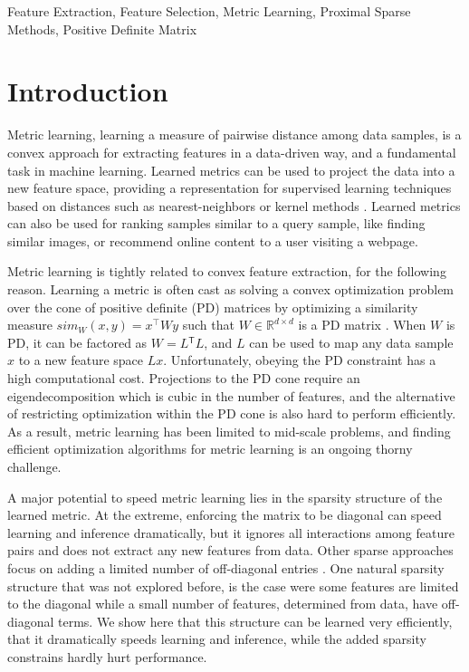 \documentclass[twoside,11pt]{article}
\newcommand\mat[1]{{#1}}
\newcommand{\T}{{}^\mathsf{T}}
\newcommand{\W}{\mat{W}}
\newcommand{\R}{\mathbb{R}}
\newcommand{\cholL}{\mat{L}}
\begin{document}
\begin{keywords}
  Feature Extraction, Feature Selection, Metric Learning, Proximal Sparse Methods, Positive Definite Matrix 
\end{keywords}

\section{Introduction}
Metric learning, learning a measure of pairwise distance among data samples, is a convex approach for extracting features in a data-driven way, and a fundamental task in machine learning. Learned metrics can be used to project the data into a new feature space, providing a representation for supervised learning techniques based on distances such as nearest-neighbors or kernel methods \citep{kulis2012survey}.
Learned metrics can also be used for ranking samples similar to a query sample, like finding similar images, or recommend online content to a user visiting a webpage. 

Metric learning is tightly related to convex feature extraction, for the following reason. Learning a metric is often cast as solving a convex optimization problem over the cone of positive definite (PD) matrices by optimizing a similarity measure $sim_W (x,y) = x^\top W y$ such that $W \in \R^{d \times d}$ is a PD matrix  \citep{kulis2012survey,bellet2013survey}. 
When $\W$ is PD, it can be factored as $\W= \cholL\T \cholL$, and $\cholL$ can be used to map any data sample $x$ to a new feature space $\cholL x$. Unfortunately, obeying the PD constraint has a high computational cost. Projections to the PD cone require an eigendecomposition which is cubic in the number of features, and the alternative of restricting optimization within the PD cone is also hard to perform efficiently. As a result, metric learning has been limited to mid-scale problems, and finding efficient optimization algorithms for metric learning is an ongoing thorny challenge. 


A major potential to speed metric learning lies in the sparsity structure of the learned metric. At the extreme, enforcing the matrix to be diagonal can speed learning and inference dramatically, but it ignores all interactions among feature pairs and does not extract any new features from  data. Other sparse approaches focus on adding a limited number of off-diagonal entries \citep{HDSL}. One natural sparsity structure that was not explored before, is the case were some features are limited to the diagonal while a small number of features, determined from data, have off-diagonal terms. We show here that this structure can be learned very efficiently, that it dramatically speeds learning and inference, while the added sparsity constrains hardly hurt performance. 
\end{document}
